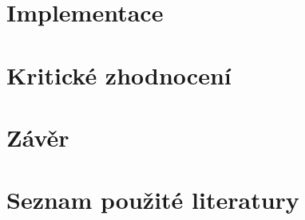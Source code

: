 \documentclass[FM,Proj]{tulthesis}
\begin{document}
	\chapter{Implementace}
	
	\chapter{Kritické zhodnocení}
	
	\chapter{Závěr}
	
	\chapter*{Seznam použité literatury}
	\printbibliography[heading=none]
	
\end{document}
